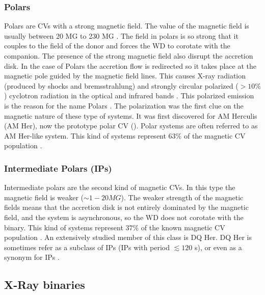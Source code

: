 \subsubsection{Polars}

Polars are CVs with a strong magnetic field. The value of the magnetic field is usually between 20 MG to 230  MG \citep{balman_x-ray_2012}. The field in polars is so strong that it couples to the field of the donor and forces the WD to corotate with the companion. The presence of the strong magnetic field also disrupt the accretion disk. In the case of Polars the accretion flow is redirected so it takes place at the magnetic pole guided by the magnetic field lines. This causes X-ray radiation (produced by shocks and bremsstrahlung)  and strongly circular polarized ($> 10 \%$) cyclotron radiation in the optical and infrared bands \citep{cropper_polars_1990}. This polarized emission is the reason for the name Polars \citep{krzeminski_extremely_1977}. The polarization was the first clue on the magnetic nature of these type of systems. It was first discovered for AM Herculis (AM Her), now the prototype polar CV (\cite{tapia_discovery_1977}). Polar systems are often referred to as AM Her-like system. This kind of systems represent $63 \%$ of the magnetic CV population \citep{balman_x-ray_2012}.

\subsubsection{Intermediate Polars (IPs)}

Intermediate polars are the second kind of magnetic CVs. In this type the magnetic field is weaker ($\sim 1-20 MG$). The weaker strength of the magnetic fields means that the accretion disk is not entirely dominated by the magnetic field, and the system is asynchronous, so the WD does not corotate with the binary. This kind of systems represent $37 \%$ of the known magnetic CV population \citep{balman_x-ray_2012}. An extensively studied member of this class is DQ Her. DQ Her is sometimes refer as a subclass of IPs (IPs with period $\lesssim 120 $ s), or even as a synonym for IPs \citep{patterson_dq_1994,warner_cataclysmic_2003}.  



\subsection{X-Ray binaries}

